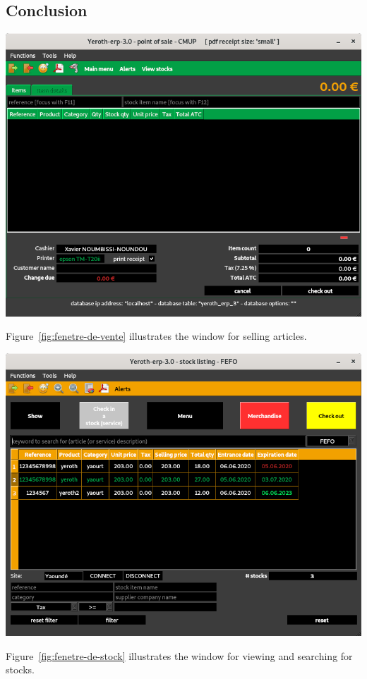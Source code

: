 \documentclass[a4paper, 10pt]{article}
\begin{document}
\begin{multicols}{2}
\section{Conclusion}
\begin{center}
\includegraphics[scale=0.33]{../../francais/images/yeren-pos-7-0-window-cashier.png}
\end{center}

Figure~\ref{fig:fenetre-de-vente} illustrates
the window for selling articles.

\begin{center}
\includegraphics[scale=0.33]{images/yeroth-stock-listing-window.png}
\label{fig:fenetre-de-stock}
\end{center}

Figure~\ref{fig:fenetre-de-stock} illustrates
the window for viewing and searching for stocks.

\end{multicols}
\end{document}
